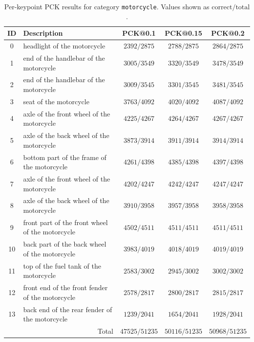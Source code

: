 \begin{table}[h]
\centering
\small
\caption{Per-keypoint PCK results for category \texttt{motorcycle}. Values shown as $\text{correct}/\text{total}$.}
\label{tab:pck_motorcycle}
\begin{tabular}{cl ccc}
\toprule
ID & Description & PCK@0.1 & PCK@0.15 & PCK@0.2 \\
\midrule
0 & headlight of the motorcycle & $2392/2875$ & $2788/2875$ & $2864/2875$ \\
1 & end of the handlebar of the motorcycle & $3005/3549$ & $3320/3549$ & $3478/3549$ \\
2 & end of the handlebar of the motorcycle & $3009/3545$ & $3301/3545$ & $3481/3545$ \\
3 & seat of the motorcycle & $3763/4092$ & $4020/4092$ & $4087/4092$ \\
4 & axle of the front wheel of the motorcycle & $4225/4267$ & $4264/4267$ & $4267/4267$ \\
5 & axle of the back wheel of the motorcycle & $3873/3914$ & $3911/3914$ & $3914/3914$ \\
6 & bottom part of the frame of the motorcycle & $4261/4398$ & $4385/4398$ & $4397/4398$ \\
7 & axle of the front wheel of the motorcycle & $4202/4247$ & $4242/4247$ & $4247/4247$ \\
8 & axle of the back wheel of the motorcycle & $3910/3958$ & $3957/3958$ & $3958/3958$ \\
9 & front part of the front wheel of the motorcycle & $4502/4511$ & $4511/4511$ & $4511/4511$ \\
10 & back part of the back wheel of the motorcycle & $3983/4019$ & $4018/4019$ & $4019/4019$ \\
11 & top of the fuel tank of the motorcycle & $2583/3002$ & $2945/3002$ & $3002/3002$ \\
12 & front end of the front fender of the motorcycle & $2578/2817$ & $2800/2817$ & $2815/2817$ \\
13 & back end of the rear fender of the motorcycle & $1239/2041$ & $1654/2041$ & $1928/2041$ \\
\midrule
\multicolumn{2}{r}{Total} & $47525/51235$ & $50116/51235$ & $50968/51235$ \\
\bottomrule
\end{tabular}
\end{table}

